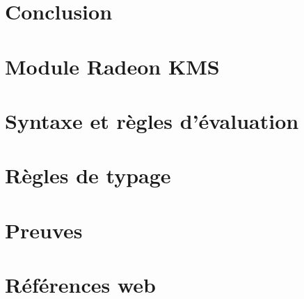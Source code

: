 \documentclass[a4paper,11pt]{memoir}
\def\partintro{}
\begin{document}
\label{cha:etudedecas}


\def\partintro{}


\chapter{Conclusion}

\label{cha:conclusion}


\def\partintro{}
\appendix
\renewcommand{\appendixpagename}{Annexes}
\renewcommand{\appendixtocname}{\appendixpagename}
\appendixpage*

\chapter{Module Radeon KMS}

\label{cha:code-noyau}


\chapter{Syntaxe et règles d'évaluation}
\label{anx:eval}



\chapter{Règles de typage}
\label{anx:typage}



\chapter{Preuves}



\backmatter{}


\clearpage{}

\renewcommand\listfigurename{Liste des figures}
\listoffigures{}

\clearpage{}

\renewcommand{\listtheoremname}{Liste des définitions}
\listoftheorems[ignoreall,show={definition}]

\renewcommand{\listtheoremname}{Liste des théorèmes et lemmes}
\listoftheorems[ignoreall,show={theorem,lemma}]

\chapter{Références web}

\insertlinks{}






\end{document}
